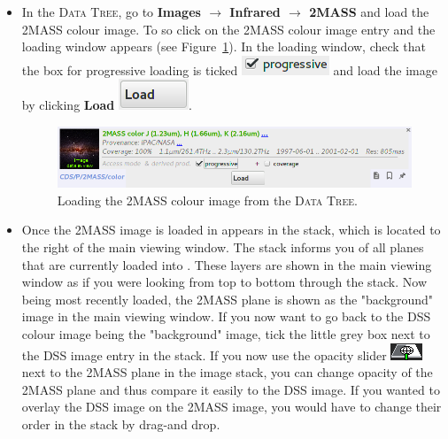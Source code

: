 \documentclass [a4paper, 12pt]{article}
\begin{document}
\begin{itemize}
    \item In the \textsc{Data Tree}, go to \textbf{Images $\rightarrow$
Infrared $\rightarrow$ 2MASS} and load the 2MASS colour image. To so click on
the 2MASS colour image entry and the loading window appears (see
Figure~\ref{fig:aladin_load_2mass}). In the loading window, check that the box
for progressive loading is ticked \includegraphics[width=0.07
\textwidth]{../images/aladin_load_progessive.png} and load the image by
clicking \textbf{Load}  \includegraphics[width=0.07
\textwidth]{../images/aladin_load_load.png}.

\begin{figure}[H]
    \center
    \includegraphics[width=1
    \textwidth]{../images/aladin_load_2mass-rgb-image.png}
    \caption{Loading the 2MASS colour image from the \textsc{Data Tree}. }
    \label{fig:aladin_load_2mass}
\end{figure}

    \item Once the 2MASS image is loaded in appears in the stack, which is
    located to the right of the main viewing window. The stack informs you of
    all planes that are currently loaded into \aladin. These layers are shown
    in the main viewing window as if you were looking from top to bottom
    through the stack. Now being most recently loaded, the 2MASS plane is shown
    as the "background" image in the main viewing window. If you now want to go
    back to the DSS colour image being the "background" image, tick the little
    grey box next to the DSS image entry in the stack. If you now use the
    opacity slider \includegraphics[width=0.035
    \textwidth]{../images/aladin_button_opacity.png} next to the 2MASS plane in
    the image stack, you can change opacity of the 2MASS plane and thus compare
    it easily to the DSS image. If you wanted to overlay the DSS image on the
    2MASS image, you would have to change their order in the stack by drag-and
    drop.


\end{itemize}
\end{document}
